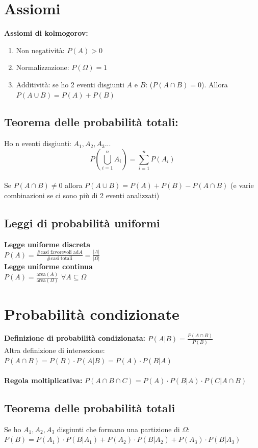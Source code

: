 \documentclass{article}
\begin{document}
	\allsectionsfont{\small}
	\scriptsize
	
	\begin{multicols*}{3}
		\section{Assiomi}
		\textbf{Assiomi di kolmogorov:}	
		\begin{enumerate}
			\setlength\itemsep{0.1mm}
			\item Non negatività: \(P(A)>0\)
			\item Normalizzazione: \(P(\Omega)=1\)
			\item Additività: se ho 2 eventi disgiunti \(A\) e \(B\): (\(P(A\cap B)=0\)). Allora \(P(A\cup B)= P(A)+P(B)\)
		\end{enumerate}
		\subsection{Teorema delle probabilità totali:}
		Ho n eventi disgiunti: \(A_1,A_2,A_3...\)\\
		\[P(\bigcup_{i=1}^{n}A_i)= \sum_{i=1}^{n}P(A_i)\]\\
		Se \(P(A\cap B)\neq 0\) allora \(P(A\cup B)= P(A)+P(B)-P(A\cap B)\) (e varie combinazioni se ci sono più di 2 eventi analizzati)
		\subsection{Leggi di probabilità uniformi}
		\textbf{Legge uniforme discreta}\\	
		\(P(A)= \frac{\#\text{casi favorevoli ad}A}{\#\text{casi totali}} = \frac{|A|}{|\Omega|}\)\\
		\textbf{Legge uniforme continua}\\
		\(P(A)=\frac{\text{area}(A)}{\text{area}(\Omega)}\) \(\forall A\subseteq \Omega\)
		
		\section{Probabilità condizionate}
		\textbf{Definizione di probabilità condizionata:}
		\(P(A|B)=\frac{P(A\cap B)}{P(B)}\)\\
		Altra definizione di intersezione: \(P(A\cap B)= P(B)\cdot P(A|B) = P(A)\cdot P(B|A)\)\\\\
		\textbf{Regola moltiplicativa:}
		\(P(A\cap B \cap C)= P(A)\cdot P(B|A) \cdot P(C|A\cap B)\)\\
		\subsection{Teorema delle probabilità totali}
		Se ho \(A_1,A_2,A_3\) disgiunti che formano una partizione di \(\Omega\):\\
		\(P(B)= P(A_1)\cdot P(B|A_1)+ P(A_2)\cdot P(B|A_2)+ P(A_3)\cdot P(B|A_3)\)

\end{multicols*}
\end{document}
